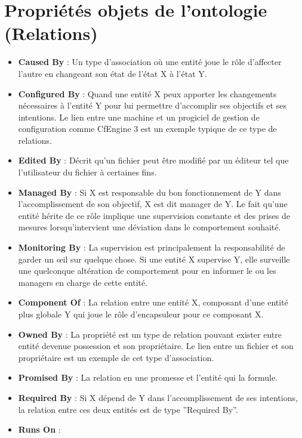 \section{Propriétés objets de l'ontologie (Relations)}

\begin{itemize}
  \item \textbf{Caused By} :
          Un type d'association où une entité joue le rôle d'affecter l'autre en
	  changeant son état de l'état X à l'état Y.
  \item \textbf{Configured By} : 
	  Quand une entité X peux apporter les changements nécessaires à
	  l'entité Y pour lui permettre d'accomplir ses objectifs et ses
	  intentions. Le lien entre une machine et un progiciel de gestion de
	  configuration comme CfEngine 3 est un exemple typique de ce type de
	  relations.
  \item \textbf{Edited By} : 
	  Décrit qu'un fichier peut être modifié par un éditeur tel que
	  l'utilisateur du fichier à certaines fins.
  \item \textbf{Managed By} : 
	  Si X est responsable du bon fonctionnement de Y dans l'accomplissement
	  de son objectif, X est dit manager de Y. Le fait qu'une entité hérite
	  de ce rôle implique une supervision constante et des prises de mesures
	  lorsqu'intervient une déviation dans le comportement souhaité.
  \item \textbf{Monitoring By} : 
	  La supervision est principalement la responsabilité de garder un œil
	  sur quelque chose. Si une entité X supervise Y, elle surveille une
	  quelconque altération de comportement pour en informer le ou les
	  managers en charge de cette entité.
  \item \textbf{Component Of} : 
	  La relation entre une entité X, composant d'une entité plus globale Y
      qui joue le rôle d'encapsuleur pour ce composant X.
  \item \textbf{Owned By} : 
	  La propriété est un type de relation pouvant exister entre entité
	  devenue possession et son propriétaire. Le lien entre un fichier et son
	  propriétaire est un exemple de cet type d'association.
  \item \textbf{Promised By} : 
	  La relation en une promesse et l'entité qui la formule. 
  \item \textbf{Required By} : 
	  Si X dépend de Y dans l'accomplissement de ses intentions, la relation
	  entre ces deux entités est de type ''Required By''.
  \item \textbf{Runs On} : 

\end{itemize}
